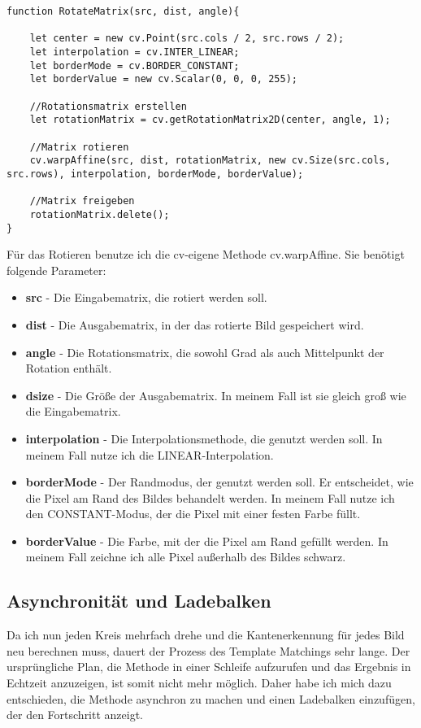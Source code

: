 \begin{lstlisting}[style=JavaScript]
function RotateMatrix(src, dist, angle){

    let center = new cv.Point(src.cols / 2, src.rows / 2);
    let interpolation = cv.INTER_LINEAR;
    let borderMode = cv.BORDER_CONSTANT;
    let borderValue = new cv.Scalar(0, 0, 0, 255);

    //Rotationsmatrix erstellen
    let rotationMatrix = cv.getRotationMatrix2D(center, angle, 1);

    //Matrix rotieren
    cv.warpAffine(src, dist, rotationMatrix, new cv.Size(src.cols, src.rows), interpolation, borderMode, borderValue);

    //Matrix freigeben
    rotationMatrix.delete();
}
\end{lstlisting}

Für das Rotieren benutze ich die cv-eigene Methode cv.warpAffine. Sie benötigt folgende Parameter:

\begin{itemize}
    \item \textbf{src} - Die Eingabematrix, die rotiert werden soll.
    \item \textbf{dist} - Die Ausgabematrix, in der das rotierte Bild gespeichert wird.
    \item \textbf{angle} - Die Rotationsmatrix, die sowohl Grad als auch Mittelpunkt der Rotation enthält.
    \item \textbf{dsize} - Die Größe der Ausgabematrix. In meinem Fall ist sie gleich groß wie die Eingabematrix.
    \item \textbf{interpolation} - Die Interpolationsmethode, die genutzt werden soll. In meinem Fall nutze ich die LINEAR-Interpolation.
    \item \textbf{borderMode} - Der Randmodus, der genutzt werden soll. Er entscheidet, wie die Pixel am Rand des Bildes behandelt werden. In meinem Fall nutze ich den CONSTANT-Modus, der die Pixel mit einer festen Farbe füllt.
    \item \textbf{borderValue} - Die Farbe, mit der die Pixel am Rand gefüllt werden. In meinem Fall zeichne ich alle Pixel außerhalb des Bildes schwarz.
\end{itemize}

\subsection{Asynchronität und Ladebalken}
Da ich nun jeden Kreis mehrfach drehe und die Kantenerkennung für jedes Bild neu berechnen muss, dauert der Prozess des Template Matchings sehr lange. Der ursprüngliche Plan, die Methode in einer Schleife aufzurufen und das Ergebnis in Echtzeit anzuzeigen, ist somit nicht mehr möglich. Daher habe ich mich dazu entschieden, die Methode asynchron zu machen und einen Ladebalken einzufügen, der den Fortschritt anzeigt.

